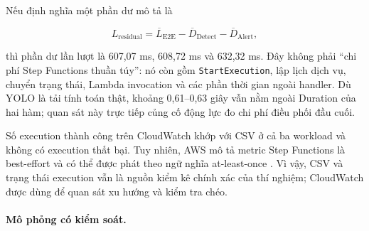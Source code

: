 Nếu định nghĩa một phần dư mô tả là

\begin{equation}
L_{\mathrm{residual}} = \overline{L}_{\mathrm{E2E}}
- \overline{D}_{\mathrm{Detect}} - \overline{D}_{\mathrm{Alert}},
\label{eq:cloud-residual}
\end{equation}

thì phần dư lần lượt là 607,07 ms, 608,72 ms và 632,32 ms. Đây không phải ``chi phí
Step Functions thuần túy'': nó còn gồm \texttt{StartExecution}, lập lịch dịch vụ,
chuyển trạng thái, Lambda invocation và các phần thời gian ngoài handler. Dù YOLO
là tải tính toán thật, khoảng 0,61--0,63 giây vẫn nằm ngoài Duration của hai hàm;
quan sát này trực tiếp củng cố động lực đo chi phí điều phối đầu cuối.

Số execution thành công trên CloudWatch khớp với CSV ở cả ba workload và không có
execution thất bại. Tuy nhiên, AWS mô tả metric Step Functions là best-effort và có
thể được phát theo ngữ nghĩa at-least-once \cite{awsStepFunctionsMetrics}. Vì vậy,
CSV và trạng thái execution vẫn là nguồn kiểm kê chính xác của thí nghiệm;
CloudWatch được dùng để quan sát xu hướng và kiểm tra chéo.

\paragraph{Mô phỏng có kiểm soát.}

\begin{table}[htbp]
    \centering
    \caption{Kết quả Cloud và Edge simulator theo ba mức tải}
    \label{tab:sim-results}
\end{table}

